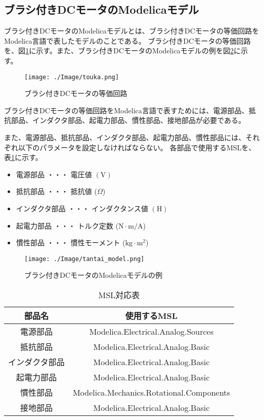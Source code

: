 \subsection{ブラシ付きDCモータのModelicaモデル}\label{sub:tanntai}
ブラシ付きDCモータのModelicaモデルとは、ブラシ付きDCモータの等価回路\cite{等価回路}をModelica言語で表したモデルのことである。
ブラシ付きDCモータの等価回路を、図\ref{fig:touka}に示す。また、ブラシ付きDCモータのModelicaモデルの例を図\ref{fig:tantai_model}に示す。
\begin{figure}[t]
	\centering
	\texttt{[image: ./Image/touka.png]}
	\caption{ブラシ付きDCモータの等価回路}
	\label{fig:touka}
  \end{figure}
ブラシ付きDCモータの等価回路をModelica言語で表すためには、電源部品、抵抗部品、インダクタ部品、起電力部品、慣性部品、接地部品が必要である。

また、電源部品、抵抗部品、インダクタ部品、起電力部品、慣性部品には、それぞれ以下のパラメータを設定しなければならない。
各部品で使用するMSLを、表\ref{tab:MSL}に示す。
\begin{itemize}
	\item 電源部品 ・・・ 電圧値 $(\mathrm{V})$
	\item 抵抗部品 ・・・ 抵抗値 ($\Omega$)
	\item インダクタ部品 ・・・ インダクタンス値 $(\mathrm{H})$
	\item 起電力部品 ・・・ トルク定数 ($\mathrm{N\cdot m/A}$)
	\item 慣性部品 ・・・ 慣性モーメント ($\mathrm{kg\cdot m^2}$)
\end{itemize}

\begin{figure}[t]
	\centering
	\texttt{[image: ./Image/tantai\_model.png]}
	\caption{ブラシ付きDCモータのModelicaモデルの例}
	\label{fig:tantai_model}
  \end{figure}
  

\begin{table}[t]
	\centering
	\caption{MSL対応表}
	\begin{tabular}{|c|c|} \hline
	  部品名 & 使用するMSL \\ \hline \hline
	  電源部品 & Modelica.Electrical.Analog.Sources \\ \hline
	  抵抗部品 & Modelica.Electrical.Analog.Basic \\ \hline
	  インダクタ部品 & Modelica.Electrical.Analog.Basic \\ \hline
	  起電力部品 & Modelica.Electrical.Analog.Basic \\ \hline
	  慣性部品 & Modelica.Mechanics.Rotational.Components \\ \hline
	  接地部品 & Modelica.Electrical.Analog.Basic \\ \hline
	\end{tabular}
	\label{tab:MSL}
  \end{table}


